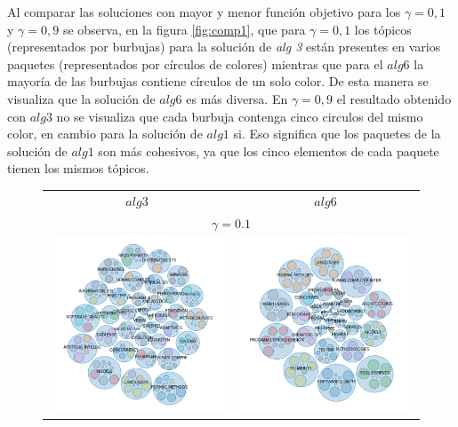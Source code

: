Al comparar las soluciones con mayor y menor función objetivo para los $\gamma = 0,1$ y $\gamma = 0,9$ se observa, en la figura \ref{fig:comp1}, que para $\gamma = 0,1$ los tópicos (representados por burbujas) para la solución de \textit{alg 3} están presentes en varios paquetes (representados por círculos de colores) mientras que para el $alg6$ la mayoría de las burbujas contiene círculos de un solo color. De esta manera se visualiza que la solución de $alg6$ es más diversa. En $\gamma = 0,9$ el resultado obtenido con $alg3$ no se visualiza que cada burbuja contenga cinco circulos del mismo color, en cambio para la solución de $alg1$ si. Eso significa que los paquetes de la solución de $alg1$ son más cohesivos, ya que los cinco elementos de cada paquete tienen los mismos tópicos.

\begin{figure}[H]
	\centering
	\begin{tabular}{cc}
		$alg3$ & $alg6$\\
		\multicolumn{2}{c}{$\gamma=0.1$}\\ 
			\includegraphics[width=0.5\linewidth]{img/gamma-01-burbujas-alg-3.png}&
			\includegraphics[width=0.5\linewidth]{img/gamma-01-burbujas-alg-6.png} 		\vspace{1cm}\\

\end{tabular}
\end{figure}
